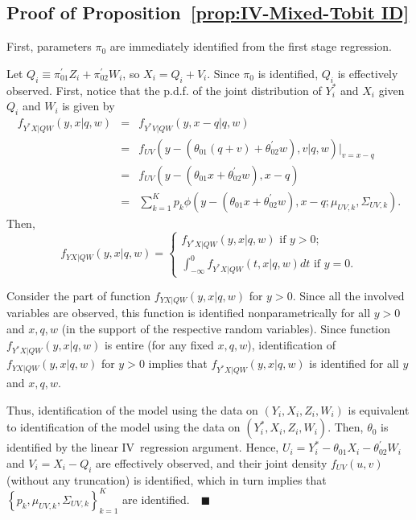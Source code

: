 \documentclass[12pt]{article}
\begin{document}
\begin{appendices}
\bigskip

\subsection{Proof of Proposition~\protect\ref{prop:IV-Mixed-Tobit ID}}

First, parameters $\pi _{0}$ are immediately identified from the first stage
regression.

Let $Q_{i}\equiv \pi _{01}^{\prime }Z_{i}+\pi _{02}^{\prime }W_{i}$, so $%
X_{i}=Q_{i}+V_{i}$. Since $\pi_0$ is identified, $Q_i$ is effectively
observed. First, notice that the p.d.f. of the joint distribution of $Y_i^*$
and $X_i$ given $Q_i$ and $W_i$ is given by 
\begin{eqnarray*}
f_{Y^{\ast }X|QW}\left( y,x|q,w\right) &=&f_{Y^*V|QW}\left( y,x-q|q,w\right)
\\
&=&f_{UV}\left( y-\left( \theta _{01}\left( q+v\right) +\theta _{02}^{\prime
}w\right) ,v|q,w\right) |_{v=x-q} \\
&=&f_{UV}\left( y-\left( \theta _{01}x+\theta _{02}^{\prime }w\right)
,x-q\right) \\
&=&\sum_{k=1}^{K}p_{k}\phi (y-\left( \theta _{01}x+\theta _{02}^{\prime
}w\right) ,x-q;\mu _{UV,k},\Sigma _{UV,k}).
\end{eqnarray*}%
Then,%
\begin{equation*}
f_{YX|QW}\left( y,x|q,w\right) =\left\{ 
\begin{array}{c}
f_{Y^{\ast }X|QW}\left( y,x|q,w\right) \text{ if }y>0; \\ 
\int_{-\infty }^{0}f_{Y^{\ast }X|QW}\left( t,x|q,w\right) dt\text{ if }y=0.%
\end{array}%
\right.
\end{equation*}

Consider the part of function $f_{YX|QW}\left( y,x|q,w\right) $ for $y>0$.
Since all the involved variables are observed, this function is identified
nonparametrically for all $y>0$ and $x,q,w$ (in the support of the
respective random variables). Since function $f_{Y^{\ast }X|QW}\left(
y,x|q,w\right) $ is entire (for any fixed $x,q,w$), identification of $%
f_{YX|QW}\left( y,x|q,w\right) $ for $y>0$ implies that $f_{Y^{\ast
}X|QW}\left( y,x|q,w\right) $ is identified for all $y$ and $x,q,w$.

Thus, identification of the model using the data on $\left(
Y_{i},X_{i},Z_{i},W_{i}\right) $ is equivalent to identification of the
model using the data on $\left( Y_{i}^{\ast },X_{i},Z_{i},W_{i}\right) $.
Then, $\theta _{0}$ is identified by the linear IV\ regression argument.
Hence, $U_{i}=Y_{i}^{\ast }-\theta _{01}X_{i}-\theta _{02}^{\prime }W_{i}$
and $V_{i}=X_{i}-Q_{i}$ are effectively observed, and their joint density $%
f_{UV}\left( u,v\right) $ (without any truncation) is identified, which in
turn implies that $\left\{ p_{k},\mu _{UV,k},\Sigma _{UV,k}\right\}
_{k=1}^{K}$ are identified.$\quad \blacksquare $


\end{appendices}
\end{document}
